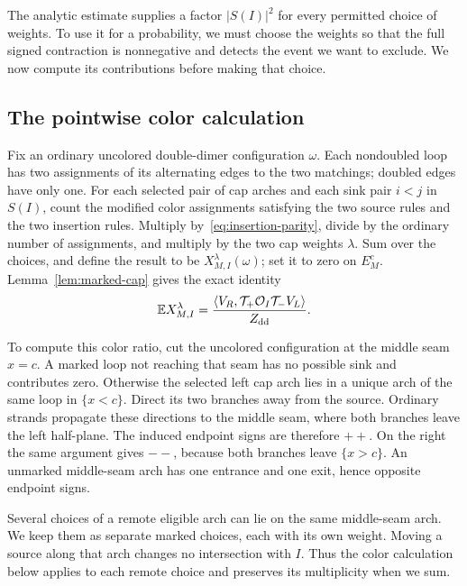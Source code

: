 The analytic estimate supplies a factor $|S(I)|^2$ for every permitted
choice of weights.  To use it for a probability, we must choose the
weights so that the full signed contraction is nonnegative and detects
the event we want to exclude.  We now compute its contributions before
making that choice.

\subsection{The pointwise color calculation}

Fix an ordinary uncolored double-dimer configuration $\omega$.  Each
nondoubled loop has two assignments of its alternating edges to the
two matchings; doubled edges have only one.  For each selected pair of
cap arches and each sink pair $i<j$ in $S(I)$, count the modified color assignments
satisfying the two source rules and the two insertion rules.  Multiply
by~\eqref{eq:insertion-parity}, divide by the ordinary number of
assignments, and multiply by the two cap weights $\lambda$.  Sum over
the choices, and define the result to be $X^\lambda_{M,I}(\omega)$;
set it to zero on $E_M^c$.  Lemma~\ref{lem:marked-cap} gives the exact
identity
\begin{equation}\label{eq:observable-contraction}
 \mathbb E X^\lambda_{M,I}
 =\frac{\langle V_R,\mathcal T_+\mathcal O_I\mathcal T_-V_L\rangle}
        {Z_{\rm dd}}.
\end{equation}

To compute this color ratio, cut the uncolored configuration at the
middle seam $x=c$.  A marked loop not reaching that seam has no possible
sink and contributes zero.  Otherwise the selected left cap arch lies
in a unique arch of the same loop in $\{x<c\}$.  Direct its two branches
away from the source.  Ordinary strands propagate these directions to
the middle seam, where both branches leave the left half-plane.
The induced endpoint signs are therefore $++$.  On the right the same
argument gives $--$, because both branches leave $\{x>c\}$.
An unmarked middle-seam arch has one entrance and one exit, hence
opposite endpoint signs.

Several choices of a remote eligible arch can lie on the same
middle-seam arch.  We keep them as separate marked choices, each with
its own weight.  Moving a source along that arch changes no
intersection with $I$.  Thus the color calculation below applies to
each remote choice and preserves its multiplicity when we sum.

